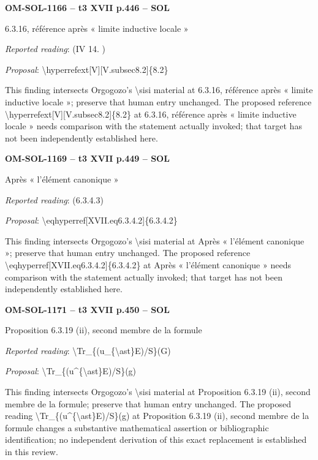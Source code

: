 \par\noindent\textbf{OM-SOL-1166 -- t3 XVII p.446 -- SOL}\par
6.3.16, référence après « limite inductive locale »\par
\emph{Reported reading}: (IV 14. )\par
\emph{Proposal}: \textbackslash{}hyperrefext[V][V.subsec8.2]\{8.2\}\par
This finding intersects Orgogozo's \textbackslash{}sisi material at 6.3.16, référence après « limite inductive locale »; preserve that human entry unchanged. The proposed reference \textbackslash{}hyperrefext[V][V.subsec8.2]\{8.2\} at 6.3.16, référence après « limite inductive locale » needs comparison with the statement actually invoked; that target has not been independently established here.\par
\par\noindent\textbf{OM-SOL-1169 -- t3 XVII p.449 -- SOL}\par
Après « l'élément canonique »\par
\emph{Reported reading}: (6.3.4.3)\par
\emph{Proposal}: \textbackslash{}eqhyperref[XVII.eq6.3.4.2]\{6.3.4.2\}\par
This finding intersects Orgogozo's \textbackslash{}sisi material at Après « l'élément canonique »; preserve that human entry unchanged. The proposed reference \textbackslash{}eqhyperref[XVII.eq6.3.4.2]\{6.3.4.2\} at Après « l'élément canonique » needs comparison with the statement actually invoked; that target has not been independently established here.\par
\par\noindent\textbf{OM-SOL-1171 -- t3 XVII p.450 -- SOL}\par
Proposition 6.3.19 (ii), second membre de la formule\par
\emph{Reported reading}: \textbackslash{}Tr\_\{(u\_\{\textbackslash{}ast\}E)/S\}(G)\par
\emph{Proposal}: \textbackslash{}Tr\_\{(u\textasciicircum{}\{\textbackslash{}ast\}E)/S\}(g)\par
This finding intersects Orgogozo's \textbackslash{}sisi material at Proposition 6.3.19 (ii), second membre de la formule; preserve that human entry unchanged. The proposed reading \textbackslash{}Tr\_\{(u\textasciicircum{}\{\textbackslash{}ast\}E)/S\}(g) at Proposition 6.3.19 (ii), second membre de la formule changes a substantive mathematical assertion or bibliographic identification; no independent derivation of this exact replacement is established in this review.\par
